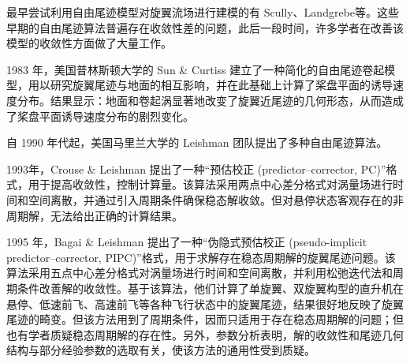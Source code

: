 最早尝试利用自由尾迹模型对旋翼流场进行建模的有 Scully、Landgrebe等。这些早期的自由尾迹算法普遍存在收敛性差的问题，此后一段时间，许多学者在改善该模型的收敛性方面做了大量工作。

1983 年，美国普林斯顿大学的 Sun \& Curtiss 建立了一种简化的自由尾迹卷起模型，用以研究旋翼尾迹与地面的相互影响，并在此基础上计算了桨盘平面的诱导速度分布。结果显示：地面和卷起涡显著地改变了旋翼近尾迹的几何形态，从而造成了桨盘平面诱导速度分布的剧烈变化。

自 1990 年代起，美国马里兰大学的 Leishman 团队提出了多种自由尾迹算法。

1993年，Crouse \& Leishman 提出了一种“预估校正 (predictor–corrector,
PC)”格式，用于提高收敛性，控制计算量。该算法采用两点中心差分格式对涡量场进行时间和空间离散，并通过引入周期条件确保稳态解收敛。但对悬停状态客观存在的非周期解，无法给出正确的计算结果。

1995 年，Bagai \& Leishman 提出了一种“伪隐式预估校正
(pseudo-implicit predictor–corrector, PIPC)”格式，用于求解存在稳态周期解的旋翼尾迹问题。该算法采用五点中心差分格式对涡量场进行时间和空间离散，并利用松弛迭代法和周期条件改善解的收敛性。基于该算法，他们计算了单旋翼、双旋翼构型的直升机在悬停、低速前飞、高速前飞等各种飞行状态中的旋翼尾迹，结果很好地反映了旋翼尾迹的畸变。但该方法用到了周期条件，因而只适用于存在稳态周期解的问题；但也有学者质疑稳态周期解的存在性。另外，参数分析表明，解的收敛性和尾迹几何结构与部分经验参数的选取有关，使该方法的通用性受到质疑。

